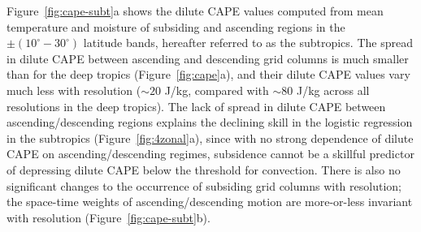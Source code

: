 \documentclass[times]{qjrms4}
\begin{document}
Figure~\ref{fig:cape-subt}a shows the dilute CAPE values computed from mean temperature and moisture of subsiding and ascending regions in the $\pm \left( 10^{\circ}-30^{\circ} \right) $ latitude bands, hereafter referred to as the subtropics. The spread in dilute CAPE between ascending and descending grid columns is much smaller than for the deep tropics (Figure~\ref{fig:cape}a), and their dilute CAPE  values vary much less with resolution ($\sim 20$ J/kg, compared with $\sim 80$ J/kg across all resolutions in the deep tropics). The lack of spread in dilute CAPE between ascending/descending regions explains the declining skill in the logistic regression in the subtropics (Figure~\ref{fig:4zonal}a), since with no strong dependence of dilute CAPE on ascending/descending regimes, subsidence cannot be a skillful predictor of depressing dilute CAPE below the threshold for convection. There is also no significant changes to the occurrence of subsiding grid columns with resolution; the space-time weights of ascending/descending motion are more-or-less invariant with resolution (Figure~\ref{fig:cape-subt}b).
\end{document}
